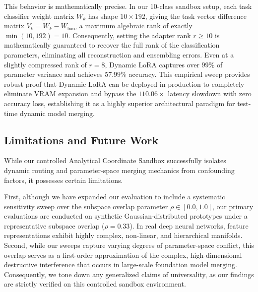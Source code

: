 This behavior is mathematically precise. In our 10-class sandbox setup, each task classifier weight matrix $W_k$ has shape $10 \times 192$, giving the task vector difference matrix $V_k = W_k - W_{\text{base}}$ a maximum algebraic rank of exactly $\min(10, 192) = 10$. Consequently, setting the adapter rank $r \ge 10$ is mathematically guaranteed to recover the full rank of the classification parameters, eliminating all reconstruction and ensembling errors. Even at a slightly compressed rank of $r=8$, Dynamic LoRA captures over $99\%$ of parameter variance and achieves $57.99\%$ accuracy. This empirical sweep provides robust proof that Dynamic LoRA can be deployed in production to completely eliminate VRAM expansion and bypass the $110.06\times$ latency slowdown with zero accuracy loss, establishing it as a highly superior architectural paradigm for test-time dynamic model merging.

\subsection{Limitations and Future Work}
\label{subsec:limitations}
While our controlled Analytical Coordinate Sandbox successfully isolates dynamic routing and parameter-space merging mechanics from confounding factors, it possesses certain limitations. 

First, although we have expanded our evaluation to include a systematic sensitivity sweep over the subspace overlap parameter $\rho \in [0.0, 1.0]$, our primary evaluations are conducted on synthetic Gaussian-distributed prototypes under a representative subspace overlap ($\rho = 0.33$). In real deep neural networks, feature representations exhibit highly complex, non-linear, and hierarchical manifolds. Second, while our sweeps capture varying degrees of parameter-space conflict, this overlap serves as a first-order approximation of the complex, high-dimensional destructive interference that occurs in large-scale foundation model merging. Consequently, we tone down any generalized claims of universality, as our findings are strictly verified on this controlled sandbox environment. 

